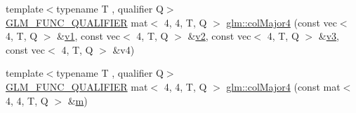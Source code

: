 \begin{DoxyCompactItemize}
\item 
{\footnotesize template$<$typename T , qualifier Q$>$ }\\\hyperlink{setup_8hpp_a33fdea6f91c5f834105f7415e2a64407}{G\+L\+M\+\_\+\+F\+U\+N\+C\+\_\+\+Q\+U\+A\+L\+I\+F\+I\+ER} mat$<$ 4, 4, T, Q $>$ \hyperlink{group__gtx__matrix__major__storage_gaf4aa6c7e17bfce41a6c13bf6469fab05}{glm\+::col\+Major4} (const vec$<$ 4, T, Q $>$ \&\hyperlink{_s_d_l__opengl__glext_8h_a435c176a02c061b43e19bdf7c86cceae}{v1}, const vec$<$ 4, T, Q $>$ \&\hyperlink{_s_d_l__opengl__glext_8h_a0928f6d0f0f794ba000a21dfae422136}{v2}, const vec$<$ 4, T, Q $>$ \&\hyperlink{_s_d_l__opengl__glext_8h_acc806b31cbf466ceba6555983d8b814d}{v3}, const vec$<$ 4, T, Q $>$ \&v4)
\item 
{\footnotesize template$<$typename T , qualifier Q$>$ }\\\hyperlink{setup_8hpp_a33fdea6f91c5f834105f7415e2a64407}{G\+L\+M\+\_\+\+F\+U\+N\+C\+\_\+\+Q\+U\+A\+L\+I\+F\+I\+ER} mat$<$ 4, 4, T, Q $>$ \hyperlink{group__gtx__matrix__major__storage_gaf3f9511c366c20ba2e4a64c9e4cec2b3}{glm\+::col\+Major4} (const mat$<$ 4, 4, T, Q $>$ \&\hyperlink{_s_d_l__opengl__glext_8h_af593500c283bf1a787a6f947f503a5c2}{m})
\end{DoxyCompactItemize}

